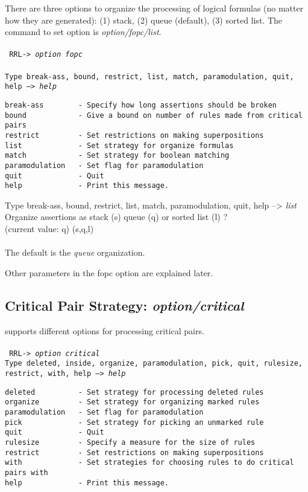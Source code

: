 There are three options to organize the processing of logical formulas
(no matter how they are generated): (1) stack, (2) queue (default),
(3) sorted list.  The command to set option is {\em option/fopc/list}.\\ \\
\tt
RRL-> {\em option fopc}\\ \\
Type break-ass, bound, restrict, list, match, paramodulation, quit, help --> {\em help}
\begin{verbatim}
break-ass        - Specify how long assertions should be broken 
bound            - Give a bound on number of rules made from critical pairs
restrict         - Set restrictions on making superpositions
list             - Set strategy for organize formulas
match            - Set strategy for boolean matching
paramodulation   - Set flag for paramodulation
quit             - Quit
help             - Print this message.
\end{verbatim}
Type break-ass, bound, restrict, list, match, paramodulation, quit, help --> {\em list} \\
Organize assertions as stack (s) queue (q) or sorted list (l) ? \\
(current value: q) (s,q,l) \\ \\
\rm
The default is the {\em queue} organization.

Other parameters in the fopc option are explained later.

\subsection{Critical Pair Strategy: {\em option/critical}}

\RRL supports different options for processing critical pairs.\\ \\
\tt
RRL-> {\em option critical}\\
Type deleted, inside, organize, paramodulation, pick, quit, rulesize, \\
\hspace*{0.4in} 
     restrict, with, help --> {\em help}
\begin{verbatim}
deleted          - Set strategy for processing deleted rules
organize         - Set strategy for organizing marked rules
paramodulation   - Set flag for paramodulation
pick             - Set strategy for picking an unmarked rule
quit             - Quit
rulesize         - Specify a measure for the size of rules
restrict         - Set restrictions on making superpositions
with             - Set strategies for choosing rules to do critical pairs with
help             - Print this message.
\end{verbatim}
\rm
  
